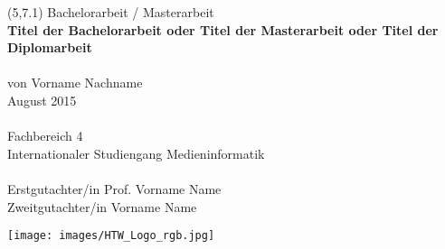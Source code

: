 \begin{titlepage}

\begingroup
\begin{textblock}{6}(5,7.1)
\setlength{\parindent}{0pt}
\fontsize{10pt}{1.1em}\selectfont
Bachelorarbeit / Masterarbeit
\vspace{0.1cm}
\\
\LARGE
{\color{htwgreen}
\textbf{Titel der Bachelorarbeit oder Titel der Masterarbeit oder Titel der Diplomarbeit}
}\\\\
\fontsize{10pt}{1.1em}\selectfont
von Vorname Nachname\\
August 2015\\\\
Fachbereich 4\\
Internationaler Studiengang Medieninformatik\\\\
Erstgutachter/in Prof. Vorname Name\\
Zweitgutachter/in Vorname Name
\end{textblock}
\endgroup
     
\vfill
        
\begin{center}
\texttt{[image: images/HTW\_Logo\_rgb.jpg]}
\end{center}

\end{titlepage}